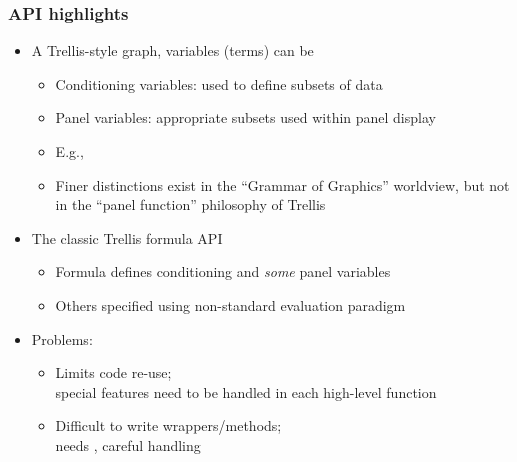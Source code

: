 \documentclass[compress]{beamer}
\begin{document}
\begin{frame}
  \frametitle{API highlights}
  \begin{itemize}
  \item A Trellis-style graph, variables (terms) can be
    \begin{itemize}
    \item Conditioning variables: used to define subsets of data
    \item Panel variables: appropriate subsets used within panel display
    \item E.g., 
    \item Finer distinctions exist in the ``Grammar of Graphics''
      worldview, but not in the ``panel function'' philosophy of
      Trellis
    \end{itemize}
  \item The classic Trellis formula API
    \begin{itemize}
    \item Formula defines conditioning and \textit{some} panel
      variables
    \item Others specified using non-standard evaluation paradigm
    \end{itemize}
  \item<2> Problems: 
    \begin{itemize}
    \item Limits code re-use; \\
      special features need to be handled in each high-level function
    \item Difficult to write wrappers/methods; \\
      needs , careful handling
    \end{itemize}
  \end{itemize}
\end{frame}
\end{document}
